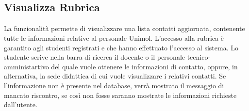 \subsection{Visualizza Rubrica}
\paragraph{}
La funzionalità permette di visualizzare una lista contatti aggiornata, contenente tutte le informazioni relative al personale Unimol. L’accesso alla rubrica è garantito agli studenti
registrati e che hanno effettuato l'accesso al sistema.
Lo studente scrive nella barra di ricerca il docente o il personale tecnico-amministartivo del quale vuole ottenere le informazioni di contatto, oppure, in alternativa, la sede didattica di cui vuole visualizzare i relativi contatti.
Se l'informazione non è presente nel database, verrà mostrato
il messaggio di mancato riscontro, se così non fosse saranno
mostrate le informazioni richieste dall'utente.